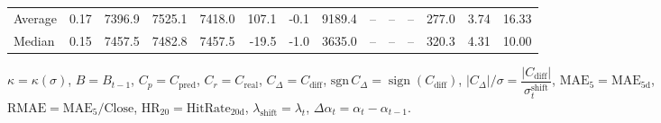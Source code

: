 \begin{threeparttable}
{\begin{tabular}{lrrrrrrrrrrrrr}
Average &     0.17 & 7396.9 & 7525.1 & 7418.0 &      107.1 &                     -0.1 &              9189.4 &         -- &        -- &             -- &            277.0 &            3.74 &                  16.33 \\
 Median &     0.15 & 7457.5 & 7482.8 & 7457.5 &      -19.5 &                     -1.0 &              3635.0 &         -- &        -- &             -- &            320.3 &            4.31 &                  10.00 \\
\bottomrule
\end{tabular}
}
\begin{tablenotes}\footnotesize
\item $\kappa=\kappa(\sigma)$, $B=B_{t-1}$, $C_p=C_{\text{pred}}$, $C_r=C_{\text{real}}$, $C_\Delta=C_{\text{diff}}$, $\mathrm{sgn}\,C_\Delta=\operatorname{sign}(C_{\text{diff}})$, $|C_\Delta|/\sigma=\dfrac{|C_{\text{diff}}|}{\sigma_t^{\text{shift}}}$, $\mathrm{MAE}_5=\mathrm{MAE}_{5\text{d}}$, $\mathrm{RMAE}= \mathrm{MAE}_5 / \text{Close}$, $\mathrm{HR}_{20}=\mathrm{HitRate}_{20\text{d}}$, 
$\lambda_{\text{shift}}=\lambda_t$, 
$\Delta\alpha_t=\alpha_t-\alpha_{t-1}$.
\end{tablenotes}
\end{threeparttable}
\endgroup
